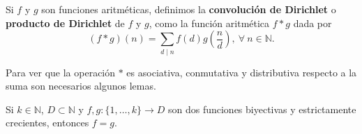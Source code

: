 \begin{definition}
Si $f$ y $g$ son funciones aritméticas, definimos la \textbf{convolución de Dirichlet} o \textbf{producto de Dirichlet} de $f$ y $g$, como la función aritmética $f*g$ dada por 
\begin{equation*}
	(f*g)(n)=\sum_{d \mid n} f(d)g\left(\frac{n}{d}\right),\:\forall \: n\in\mathbb{N}.
\end{equation*}
\end{definition}

Para ver que la operación $*$ es asociativa, conmutativa y distributiva respecto a la suma son necesarios algunos lemas.

\begin{lemma}
Si $k\in\mathbb{N}$, $D\subset \mathbb{N}$ y $f,g: \{1,\ldots,k\} \longrightarrow D$ son dos funciones biyectivas y estrictamente crecientes, entonces $f=g$.
\end{lemma}
